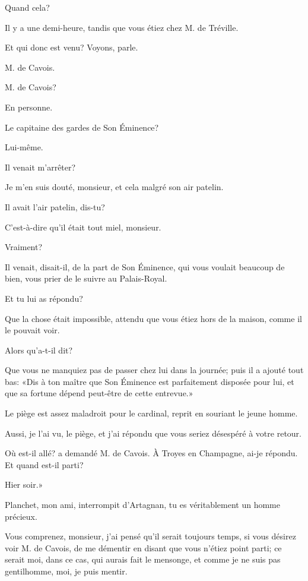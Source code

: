 \speak  Quand cela? 

\speak  Il y a une demi-heure, tandis que vous étiez chez M. de Tréville. 

\speak  Et qui donc est venu? Voyons, parle. 

\speak  M. de Cavois. 

\speak  M. de Cavois? 

\speak  En personne. 

\speak  Le capitaine des gardes de Son Éminence? 

\speak  Lui-même. 

\speak  Il venait m'arrêter? 

\speak  Je m'en suis douté, monsieur, et cela malgré son air patelin. 

\speak  Il avait l'air patelin, dis-tu? 

\speak  C'est-à-dire qu'il était tout miel, monsieur. 

\speak  Vraiment? 

\speak  Il venait, disait-il, de la part de Son Éminence, qui vous voulait beaucoup de bien, vous prier de le suivre au Palais-Royal. 

\speak  Et tu lui as répondu? 

\speak  Que la chose était impossible, attendu que vous étiez hors de la maison, comme il le pouvait voir. 

\speak  Alors qu'a-t-il dit? 

\speak  Que vous ne manquiez pas de passer chez lui dans la journée; puis il a ajouté tout bas: «Dis à ton maître que Son Éminence est parfaitement disposée pour lui, et que sa fortune dépend peut-être de cette entrevue.» 

\speak  Le piège est assez maladroit pour le cardinal, reprit en souriant le jeune homme. 

\speak  Aussi, je l'ai vu, le piège, et j'ai répondu que vous seriez désespéré à votre retour. 

\speak  Où est-il allé? a demandé M. de Cavois. À Troyes en Champagne, ai-je répondu. Et quand est-il parti? 

\speak  Hier soir.» 

\speak  Planchet, mon ami, interrompit d'Artagnan, tu es véritablement un homme précieux. 

\speak  Vous comprenez, monsieur, j'ai pensé qu'il serait toujours temps, si vous désirez voir M. de Cavois, de me démentir en disant que vous n'étiez point parti; ce serait moi, dans ce cas, qui aurais fait le mensonge, et comme je ne suis pas gentilhomme, moi, je puis mentir. 

